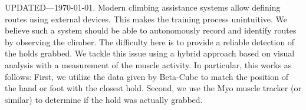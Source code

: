 UPDATED---\today.
Modern climbing assistance systems allow defining routes using external devices.
This makes the training process unintuitive.
We believe such a system should be able to autonomously record and identify routes by observing the climber.
The difficulty here is to provide a reliable detection of the holds grabbed.
We tackle this issue using a hybrid approach based on visual analysis with a measurement of the muscle activity.
In particular, this works as follows:
First, we utilize the data given by Beta-Cube to match the position of the hand or foot with the closest hold.
Second, we use the Myo muscle tracker (or similar) to determine if the hold was actually grabbed.